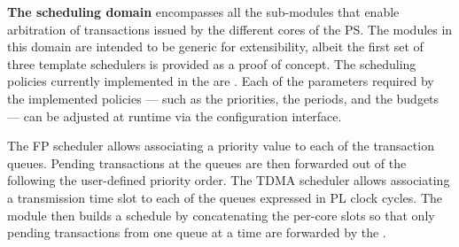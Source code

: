 \par{\bf The scheduling domain} encompasses all the sub-modules that
enable arbitration of transactions issued by the different cores of
the PS. The modules in this domain are intended to be generic for
extensibility, albeit the first set of three template schedulers is
provided as a proof of concept.  The scheduling policies currently
implemented in the \schim are .  Each of the parameters
required by the implemented policies --- such as
the priorities, the periods, and the budgets --- can be adjusted at
runtime via the configuration interface.

The FP scheduler allows associating a priority value to each of the
transaction queues. Pending transactions at the queues are then
forwarded out of the \schim following the user-defined priority
order. The TDMA scheduler allows associating a transmission time slot
to each of the queues expressed in PL clock cycles. The module then
builds a schedule by concatenating the per-core slots so that only
pending transactions from one queue at a time are forwarded by the
\schim.



